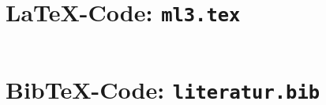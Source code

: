 \documentclass[11pt, a4paper]{article}
\begin{document}



%
%

\pagebreak

\section*{LaTeX-Code: \texttt{ml3.tex}}
\inputminted[breaklines, encoding=utf8, frame=single]%
            {LaTeX}{ml3.tex}

\section*{BibTeX-Code: \texttt{literatur.bib}}
\inputminted[breaklines, encoding=utf8, frame=single]%
            {BibTeX}{ml3.bib}
\end{document}

